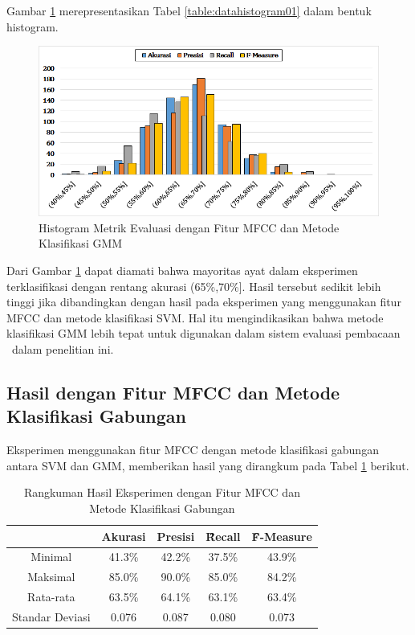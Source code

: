   Gambar \ref{fig:histogram01} merepresentasikan Tabel \ref{table:datahistogram01} dalam bentuk histogram.
  \begin{figure}
    \centering
    \includegraphics[width=\linewidth]{pics/histogram01}
    \caption{Histogram Metrik Evaluasi dengan Fitur MFCC dan Metode Klasifikasi GMM}
    \label{fig:histogram01}
  \end{figure}

  Dari Gambar \ref{fig:histogram01} dapat diamati bahwa mayoritas ayat dalam eksperimen terklasifikasi dengan rentang akurasi (65\%,70\%]. Hasil tersebut sedikit lebih tinggi jika dibandingkan dengan hasil pada eksperimen yang menggunakan fitur MFCC dan metode klasifikasi SVM. Hal itu mengindikasikan bahwa metode klasifikasi GMM lebih tepat untuk digunakan dalam sistem evaluasi pembacaan \quran~dalam penelitian ini.

  \subsection{Hasil dengan Fitur MFCC dan Metode Klasifikasi Gabungan}
  Eksperimen menggunakan fitur MFCC dengan metode klasifikasi gabungan antara SVM dan GMM, memberikan hasil yang dirangkum pada Tabel \ref{table:mfccgabungan} berikut.

  \begin{table}
    \centering
    \caption{Rangkuman Hasil Eksperimen dengan Fitur MFCC dan Metode Klasifikasi Gabungan}
    \begin{tabular}{|c|c|c|c|c|}
      \hline
       & Akurasi & Presisi & \f{\f{Recall}} & \f{\f{F-Measure}} \\ \hline
      Minimal         & 41.3\% & 42.2\% & 37.5\% & 43.9\% \\ \hline
      Maksimal        & 85.0\% & 90.0\% & 85.0\% & 84.2\% \\ \hline
      Rata-rata       & 63.5\% & 64.1\% & 63.1\% & 63.4\% \\ \hline
      Standar Deviasi & 0.076  & 0.087  & 0.080  & 0.073  \\ \hline
    \end{tabular}
    \label{table:mfccgabungan}
  \end{table}

